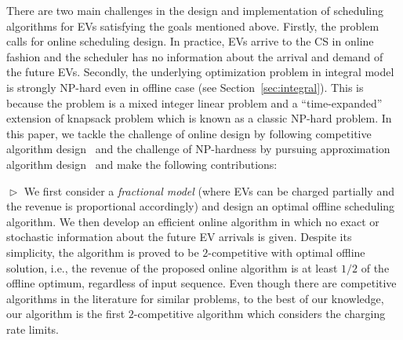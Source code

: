 \documentclass[journal]{IEEEtran}
\newcommand{\bt}[1]{{\color{blue}#1}}%
\newcommand{\rev}[1]{{\color{black}#1}}%
\newcommand{\bt}[1]{#1}
\newcommand{\rev}[1]{#1}
\begin{document}

There are two main challenges in the design and implementation of scheduling algorithms for EVs satisfying the goals mentioned above. \rev{Firstly, the problem calls for online scheduling design.} In practice, EVs arrive to the CS in online fashion and the scheduler has no information about the arrival and demand of the future EVs. Secondly, the underlying optimization problem in integral model is \bt{strongly} NP-hard even in offline case \rev{(see Section~\ref{sec:integral})}. This is because the problem is a mixed integer linear problem and a ``time-expanded'' extension of knapsack problem which is known as a classic NP-hard problem. In this paper, we tackle the challenge of online design by following competitive algorithm design~\cite{borodin2005online} and the challenge of NP-hardness by pursuing approximation algorithm design~\cite{approx} and make the following contributions: 

$\vartriangleright$ We first consider a \textit{fractional model} (where EVs can be charged partially and the revenue is proportional accordingly) and design an optimal offline scheduling algorithm. 
We then develop an efficient online algorithm in which no exact or stochastic information about the future EV arrivals is given. Despite its simplicity, the algorithm is proved to be $2$-competitive with optimal offline solution, i.e., the revenue of the proposed online algorithm is at least $1/2$ of the offline optimum, regardless of input sequence. 
Even though there are competitive algorithms in the literature for similar problems, to the best of our knowledge, our algorithm is the first $2$-competitive algorithm \rev{which considers the} charging rate limits.
\end{document}
